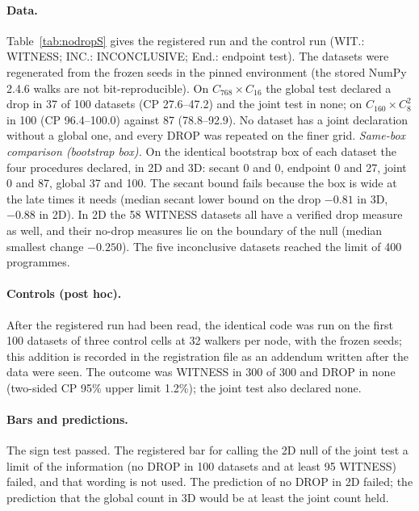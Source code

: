 \documentclass[aps,pre,twocolumn,superscriptaddress,nofootinbib,10pt]{revtex4-2}
\begin{document}
\paragraph*{Data.}
Table~\ref{tab:nodropS} gives the registered run and the control run (WIT.: WITNESS; INC.: INCONCLUSIVE; End.: endpoint test). The datasets were regenerated from the frozen seeds in the pinned environment (the stored NumPy 2.4.6 walks are not bit-reproducible). On $C_{768}\times C_{16}$ the global test declared a drop in 37 of 100 datasets (CP 27.6--47.2) and the joint test in none; on $C_{160}\times C_8^2$ in 100 (CP 96.4--100.0) against 87 (78.8--92.9). No dataset has a joint declaration without a global one, and every DROP was repeated on the finer grid. \emph{Same-box comparison (bootstrap box).} On the identical bootstrap box of each dataset the four procedures declared, in 2D and 3D: secant 0 and 0, endpoint 0 and 27, joint 0 and 87, global 37 and 100. The secant bound fails because the box is wide at the late times it needs (median secant lower bound on the drop $-0.81$ in 3D, $-0.88$ in 2D). In 2D the 58 WITNESS datasets all have a verified drop measure as well, and their no-drop measures lie on the boundary of the null (median smallest change $-0.250$). The five inconclusive datasets reached the limit of 400 programmes.

\paragraph*{Controls (post hoc).}
After the registered run had been read, the identical code was run on the first 100 datasets of three control cells at 32 walkers per node, with the frozen seeds; this addition is recorded in the registration file as an addendum written after the data were seen. The outcome was WITNESS in 300 of 300 and DROP in none (two-sided CP 95\% upper limit 1.2\%); the joint test also declared none.

\paragraph*{Bars and predictions.}
The sign test passed. The registered bar for calling the 2D null of the joint test a limit of the information (no DROP in 100 datasets and at least 95 WITNESS) failed, and that wording is not used. The prediction of no DROP in 2D failed; the prediction that the global count in 3D would be at least the joint count held.
\end{document}
